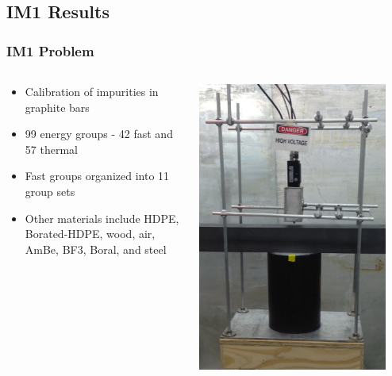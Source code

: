 \documentclass[compress,10pt]{beamer}
\begin{document}
\subsection{IM1 Results}
\begin{frame}[t]\frametitle{IM1 Problem}
\begin{columns}
\vspace{-3cm}
\begin{block}{}{\small
\begin{itemize}
	\item Calibration of impurities in graphite bars
	\item 99 energy groups - 42 fast and 57 thermal
	\item Fast groups organized into 11 group sets
	\item Other materials include HDPE, Borated-HDPE, wood, air, AmBe, BF3, Boral, and steel
\end{itemize}
}\end{block}
\centering
\includegraphics[width=0.90\textwidth]{images/IM1_exp_setup_crop.jpg}
\end{columns}
\end{frame}
\end{document}
